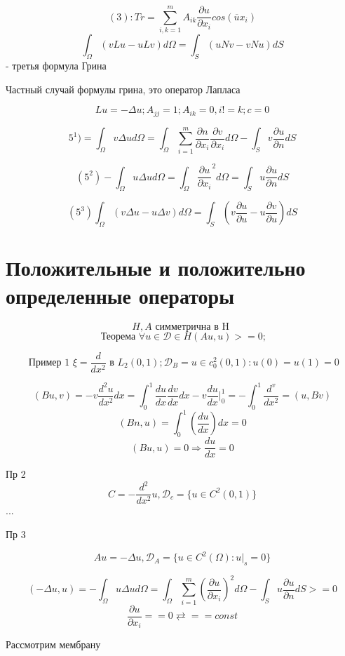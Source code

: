 \documentclass{article}
\begin{document}
\[ (3): Tr = \sum_{i,k=1}^{m } A_{ik } \frac{\partial u }{\partial x_i } cos(\overline{u} x_i) \]
\[ \int_{\Omega }^{} (vLu - uLv) d\Omega = \int_{S }^{} (u N v- vN u) dS \] - третья формула Грина

Частный случай формулы грина, это оператор Лапласа

\[ Lu = - \Delta u; A_{jj} = 1; A_{ik} = 0, i != k; c= 0 \]

\[ 5^1) = \int_{\Omega }^{} v \Delta u d\Omega  = \int_{\Omega}^{} \sum_{i=1}^{m } \frac{\partial n }{\partial x_i }  \frac{\partial v }{\partial x_i} d \Omega - \int_{S }^{} v \frac{\partial u }{\partial n } dS \]

\[ (5^2) - \int_{\Omega}^{} u \Delta u d \Omega = \int_{\Omega}^{} \frac{\partial u }{\partial x_i }^2 d \Omega= \int_{S }^{} u \frac{\partial u }{\partial n } dS  \]

\[ (5^3) \int_{\Omega}^{} (v \Delta u - u \Delta v ) d\Omega = \int_{S }^{} (v \frac{\partial u }{\partial u }- u \frac{\partial v}{\partial u}) dS \]

\section{Положительные и положительно определенные операторы}

\[ H, A \textrm{  симметрична в H } \]
\[ \textrm{ Теорема } \forall u \in \mathcal{D } \in H (Au, u) >= 0; \]

\[ \textrm{ Пример 1 } \xi = \frac{ d }{d x^2 } \textrm{ в  }L_2 (0,1); \mathcal{D }_B = {u \in c^2_0 (0,1): u(0) = u(1) = 0} \]

\[ (B u, v) = - v  \frac{d^2 u }{d x^2} dx = \int_{0}^{1} \frac{du }{dx} \frac{d v }{d x } dx - v \frac{d u }{dx }|^1_0 = - \int_{0}^{1} \frac{d^ v }{dx^2 } = (u, Bv) \]
\[ (Bn, u) = \int_{0}^{1} (\frac{du }{dx }) dx = 0 \]
\[ (Bu, u) = 0 \Rightarrow \frac{du }{dx } = 0 \]

Пр 2
\[ C = - \frac{ d^2 }{dx^2 }u, \mathcal{D}_c = \{ u \in C^2(0,1) \} \]
...


Пр 3

\[ Au = - \Delta u , \mathcal{D}_A = \{ u \in C^2(\Omega): u|_s = 0 \} \]

\[ (-\Delta u, u ) = - \int_{\Omega }^{} u \Delta u d \Omega = \int_{\Omega }^{} \sum_{i = 1}^{m } (\frac{\partial u }{\partial x_i })^2 d\Omega - \int_{S }^{} u \frac{\partial u }{\partial n } dS >= 0 \]
\[ \frac{\partial u }{\partial x_i } == 0 \rightleftarrows == const \]

Рассмотрим мембрану
\end{document}

